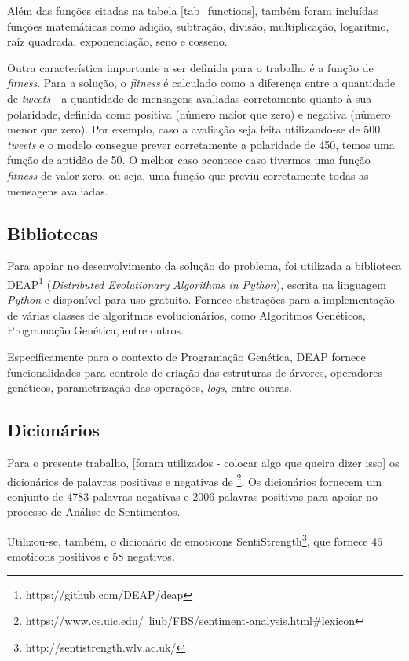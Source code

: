 \documentclass[12pt]{article}
\begin{document}
Além das funções citadas na tabela \ref{tab_functions}, também foram incluídas funções matemáticas como adição, subtração, divisão, multiplicação, logaritmo, raíz quadrada, exponenciação, seno e cosseno.

Outra característica importante a ser definida para o trabalho é a função de \emph{fitness}. Para a solução, o \emph{fitness} é calculado como a diferença entre a quantidade de \emph{tweets} - a quantidade de mensagens avaliadas corretamente quanto à sua polaridade, definida como positiva (número maior que zero) e negativa (número menor que zero). Por exemplo, caso a avaliação seja feita utilizando-se de 500 \emph{tweets} e o modelo consegue prever corretamente a polaridade de 450, temos uma função de aptidão de 50. O melhor caso acontece caso tivermos uma função \emph{fitness} de valor zero, ou seja, uma função que previu corretamente todas as mensagens avaliadas.

\subsection{Bibliotecas}

Para apoiar no desenvolvimento da solução do problema, foi utilizada a biblioteca DEAP\footnote{https://github.com/DEAP/deap} (\emph{Distributed Evolutionary Algorithms in Python}), escrita na linguagem \emph{Python} e disponível para uso gratuito. Fornece abstrações para a implementação de várias classes de algoritmos evolucionários, como Algoritmos Genéticos, Programação Genética, entre outros. \cite{DEAP_JMLR2012}

Especificamente para o contexto de Programação Genética, DEAP fornece funcionalidades para controle de criação das estruturas de árvores, operadores genéticos, parametrização das operações, \emph{logs}, entre outras.

\subsection{Dicionários}

Para o presente trabalho, [foram utilizados - colocar algo que queira dizer isso] os dicionários de palavras positivas e negativas de \cite{HuAndLiu2004}\footnote{https://www.cs.uic.edu/~liub/FBS/sentiment-analysis.html\#lexicon}. Os dicionários fornecem um conjunto de 4783 palavras negativas e 2006 palavras positivas para apoiar no processo de Análise de Sentimentos.

Utilizou-se, também, o dicionário de emoticons SentiStrength\footnote{http://sentistrength.wlv.ac.uk/}, que fornece 46 emoticons positivos e 58 negativos.
\end{document}
